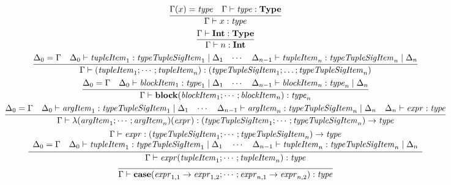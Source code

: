 \begin{gather*}
  \infer{\Gamma \vdash x: \mathit{type}}{
    \Gamma(x) = \mathit{type}
    &
    \Gamma \vdash \mathit{type}: \mathbf{Type}
  }
  \\
  \infer{\Gamma \vdash n: \mathbf{Int}}{
    \Gamma \vdash \mathbf{Int}: \mathbf{Type}
  }
  \\
  \infer{\Gamma \vdash (\mathit{tupleItem}_1; \cdots; \mathit{tupleItem}_n): (\mathit{typeTupleSigItem}_1; \ldots; \mathit{typeTupleSigItem}_n)}{
    \Delta_0 = \Gamma
    &
    \Delta_0 \vdash \mathit{tupleItem}_1: \mathit{typeTupleSigItem}_1 \mid \Delta_1
    &
    \cdots
    &
    \Delta_{n - 1} \vdash \mathit{tupleItem}_n: \mathit{typeTupleSigItem}_n \mid \Delta_n
  }
  \\
  \infer{\Gamma \vdash \mathbf{block}(\mathit{blockItem}_1; \cdots; \mathit{blockItem}_n): \mathit{type}_n}{
    \Delta_0 = \Gamma
    &
    \Delta_0 \vdash \mathit{blockItem}_1: \mathit{type}_1 \mid \Delta_1
    &
    \cdots
    &
    \Delta_{n - 1} \vdash \mathit{blockItem}_n: \mathit{type}_n \mid \Delta_n
  }
  \\
  \infer{\Gamma \vdash \lambda(\mathit{argItem}_1; \cdots; \mathit{argItem}_n)(\mathit{expr}): (\mathit{typeTupleSigItem}_1; \cdots; \mathit{typeTupleSigItem}_n) \rightarrow \mathit{type}}{
    \Delta_0 = \Gamma
    &
    \Delta_0 \vdash \mathit{argItem}_1: \mathit{typeTupleSigItem}_1 \mid \Delta_1
    &
    \cdots
    &
    \Delta_{n - 1} \vdash \mathit{argItem}_n: \mathit{typeTupleSigItem}_n \mid \Delta_n
    &
    \Delta_n \vdash \mathit{expr}: \mathit{type}
  }
  \\
  \infer{\Gamma \vdash \mathit{expr}(\mathit{tupleItem}_1; \cdots; \mathit{tupleItem}_n): \mathit{type}}{
    \begin{array}{c}
      \Gamma \vdash \mathit{expr}: (\mathit{typeTupleSigItem}_1; \cdots; \mathit{typeTupleSigItem}_n) \rightarrow \mathit{type}
      \\
      \Delta_0 = \Gamma
      \hspace{1em}
      \Delta_0 \vdash \mathit{tupleItem}_1: \mathit{typeTupleSigItem}_1 \mid \Delta_1
      \hspace{1em}
      \cdots
      \hspace{1em}
      \Delta_{n - 1} \vdash \mathit{tupleItem}_n: \mathit{typeTupleSigItem}_n \mid \Delta_n
    \end{array}
  }
  \\
  \infer{\Gamma \vdash \mathbf{case}(\mathit{expr}_{1,1} \rightarrow \mathit{expr}_{1,2}; \cdots; \mathit{expr}_{n,1} \rightarrow \mathit{expr}_{n,2}): \mathit{type}}{
}
\end{gather*}

